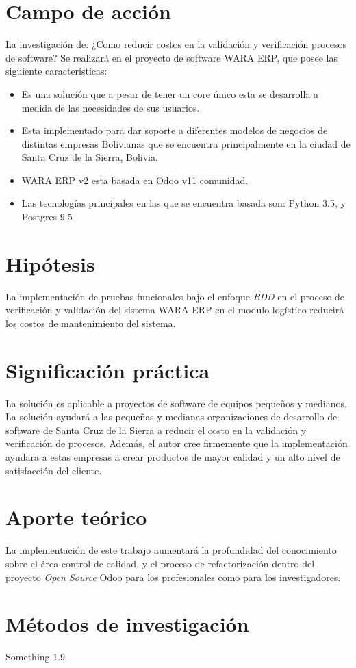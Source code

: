 \section*{Campo de acción}
\noindent
La investigación de: ¿Como reducir costos en la validación y verificación procesos de software? Se realizará en el proyecto de software WARA ERP, que posee las siguiente características:

\begin{itemize}
    \item Es una solución que a pesar de tener un core único esta se desarrolla a medida de las necesidades de sus usuarios.
    \item Esta implementado para dar soporte a diferentes modelos de negocios de distintas empresas Bolivianas que se encuentra principalmente en la ciudad de Santa Cruz de la Sierra, Bolivia.
    \item WARA ERP v2 esta basada en Odoo v11 comunidad. 
    \item Las tecnologías principales en las que se encuentra basada son: Python 3.5, y Postgres 9.5
\end{itemize}

\section*{Hipótesis}
\noindent
La implementación de pruebas funcionales bajo el enfoque \textit{BDD} en el proceso de verificación y validación del sistema WARA ERP en el modulo logístico reducirá los costos de mantenimiento del sistema.

\section*{Significación práctica}
\noindent
La solución es aplicable a proyectos de software de equipos pequeños y medianos. La solución ayudará a las pequeñas y medianas organizaciones de desarrollo de software de Santa Cruz de la Sierra a reducir el costo en la validación y verificación de procesos. Además, el autor cree firmemente que la implementación ayudara a estas empresas a crear productos de mayor calidad y un alto nivel de satisfacción del cliente.

\section*{Aporte teórico}
\noindent
La implementación de este trabajo aumentará la profundidad del conocimiento sobre el área control de calidad, y el proceso de refactorización dentro del proyecto \textit{Open Source} Odoo para los profesionales como para los investigadores.

\section*{Métodos de investigación}
Something 1.9

\iffalse
\section{Población y muestra}
Something 1.10
\fi